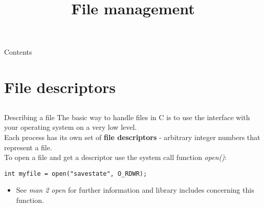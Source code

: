
\newcommand{\topic}{
	File management
}

\title{\topic}
\supertitle{\course}
\date{}



\maketitle

\begin{frame}{Contents}
	\tableofcontents
\end{frame}

\section{File descriptors}
\subsection{}

\begin{frame}[fragile = singleslide]{Describing a file}
	The basic way to handle files in C is to use the interface with your operating system on a very low level.\\
	Each process has its own set of \textbf{file descriptors} - arbitrary integer numbers that represent a file.\\ \bigskip
	To open a file and get a descriptor use the system call function \textit{open()}:\\

	\begin{lstlisting}
int myfile = open("savestate", O_RDWR);
\end{lstlisting}

	\begin{itemize}
		\item See \textit{man 2 open} for further information and library includes concerning this function.
	\end{itemize}

\end{frame}

